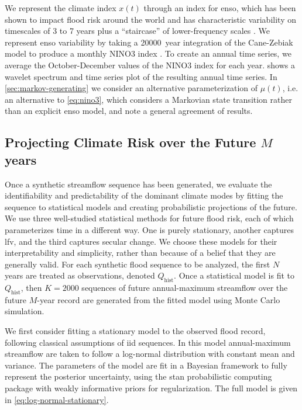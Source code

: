 \documentclass[
]{agujournal2018}
\makeatletter
\newcommand{\ie}{i.e.\@\xspace}
\makeatother
\begin{document}
We represent the climate index $x(t)$ through an index for \gls{enso}, which has been shown to impact flood risk around the world \citep{Ropelewski:1987do, Ward:2014gg} and has characteristic variability on timescales of 3 to 7 years \citep{Sarachik:2009dr} plus a ``staircase'' of lower-frequency scales \citep{Jin:1994wq}.
We represent \gls{enso} variability by taking a \SI{20000}{year} integration of the Cane-Zebiak model \citep{Zebiak:1987cl} to produce a monthly NINO3 index \citep{Ramesh:2016hf}.
To create an annual time series, we average the October-December values of the NINO3 index for each year.
 shows a wavelet spectrum and time series plot of the resulting annual time series.
In \cref{sec:markov-generating} we consider an alternative parameterization of $\mu(t)$, \ie an alternative to \cref{eq:nino3}, which considers a Markovian state transition rather than an explicit \gls{enso} model, and note a general agreement of results.

\subsection{Projecting Climate Risk over the Future $M$ years}\label{sec:methods-estimating}

Once a synthetic streamflow sequence has been generated, we evaluate the identifiability and predictability of the dominant climate modes by fitting the sequence to statistical models and creating probabilistic projections of the future.
We use three well-studied statistical methods for future flood risk, each of which parameterizes time in a different way.
One is purely stationary, another captures \gls{lfv}, and the third captures secular change.
We choose these models for their interpretability and simplicity, rather than because of a belief that they are generally valid.
For each synthetic flood sequence to be analyzed, the first $N$ years are treated as observations, denoted $Q_{\text{hist}}$.
Once a statistical model is fit to $Q_{\text{hist}}$, then $K=\num{2000}$ sequences of future annual-maximum streamflow over the future $M$-year record are generated from the fitted model using Monte Carlo simulation.

We first consider fitting a stationary model to the observed flood record, following classical assumptions of \gls{iid} sequences.
In this model annual-maximum streamflow are taken to follow a log-normal distribution with constant mean and variance.
The parameters of the model are fit  in a Bayesian framework to fully represent the posterior uncertainty, using the stan probabilistic computing package \citep{Carpenter:2017ke} with weakly informative priors for regularization.
The full model is given in \cref{eq:log-normal-stationary}.
\end{document}
